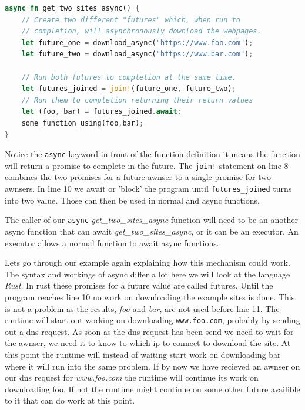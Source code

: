 \documentclass[lang=en, hanging-titles=true]{skrapport}
\begin{document}
\begin{lstlisting}[language=rust, style=boxed, tabsize=2]
async fn get_two_sites_async() {
	// Create two different "futures" which, when run to 
	// completion, will asynchronously download the webpages.
	let future_one = download_async("https://www.foo.com");
	let future_two = download_async("https://www.bar.com");

	// Run both futures to completion at the same time.
	let futures_joined = join!(future_one, future_two);
	// Run them to completion returning their return values
	let (foo, bar) = futures_joined.await;
	some_function_using(foo,bar);
}
\end{lstlisting}

Notice the \texttt{async} keyword in front of the function definition it means the function will return a promise to complete in the future. The \texttt{join!} statement on line 8 combines the two promises for a future awnser to a single promise for two awnsers. In line 10 we await or 'block' the program until \texttt{futures\_joined} turns into two value. Those can then be used in normal and async functions.

The caller of our \texttt{async} \textit{get\_two\_sites\_async} function will need to be an another async function that can await \textit{get\_two\_sites\_async}, or it can be an executor. An executor allows a normal function to await async functions.

Lets go through our example again explaining how this mechanism could work. The syntax and workings of async differ a lot here we will look at the language \textit{Rust}. In rust these promises for a future value are called futures. Until the program reaches line 10 no work on downloading the example sites is done. This is not a problem as the results, \textit{foo} and \textit{bar}, are not used before line 11. The runtime will start out working on downloading \texttt{www.foo.com}, probably by sending out a dns request. As soon as the dns request has been send we need to wait for the awnser, we need it to know to which ip to connect to download the site. At this point the runtime will instead of waiting start work on downloading bar where it will run into the same problem. If by now we have recieved an awnser on our dns request for \textit{www.foo.com} the runtime will continue its work on downloading foo. If not the runtime might continue on some other future availible to it that can do work at this point.
\end{document}
